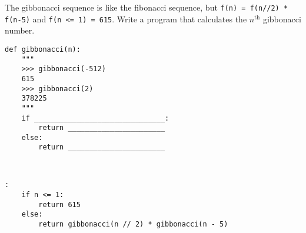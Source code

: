 \begin{blocksection}
\question The gibbonacci sequence is like the fibonacci sequence, but \texttt{f(n) = f(n//2) * f(n-5)} and \texttt{f(n <= 1) = 615}. Write a program that calculates the $n^{\text{th}}$ gibbonacci number. \\

\begin{lstlisting}
def gibbonacci(n):
    """
    >>> gibbonacci(-512)
    615
    >>> gibbonacci(2)
    378225
    """
    if _______________________________:
        return _______________________	
    else:
        return _______________________

				
\end{lstlisting}

\begin{solution}[1in]
\begin{lstlisting}:
    if n <= 1:
        return 615
    else:
        return gibbonacci(n // 2) * gibbonacci(n - 5)
\end{lstlisting}
\end{solution}
\end{blocksection}
